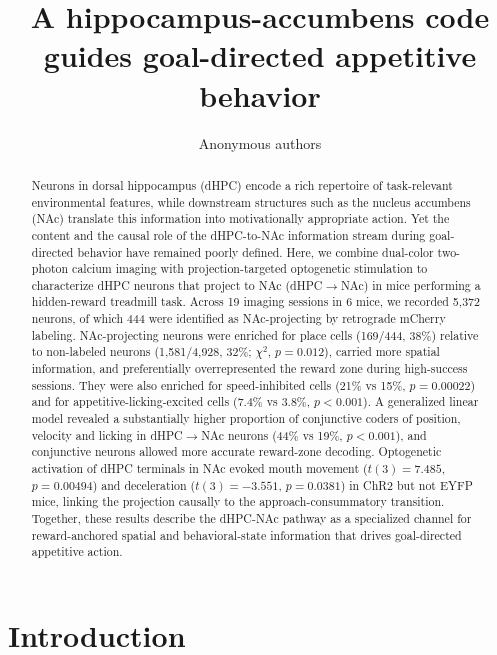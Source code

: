 \documentclass[11pt]{article}
\title{A hippocampus-accumbens code guides goal-directed appetitive behavior}
\author{Anonymous authors}
\affil{Target venue: Nature Neuroscience}
\date{}
\begin{document}
\maketitle

\begin{abstract}
Neurons in dorsal hippocampus (dHPC) encode a rich repertoire of task-relevant environmental features, while downstream structures such as the nucleus accumbens (NAc) translate this information into motivationally appropriate action. Yet the content and the causal role of the dHPC-to-NAc information stream during goal-directed behavior have remained poorly defined. Here, we combine dual-color two-photon calcium imaging with projection-targeted optogenetic stimulation to characterize dHPC neurons that project to NAc (dHPC$\rightarrow$NAc) in mice performing a hidden-reward treadmill task. Across 19 imaging sessions in 6 mice, we recorded 5{,}372 neurons, of which 444 were identified as NAc-projecting by retrograde mCherry labeling. NAc-projecting neurons were enriched for place cells (169/444, 38\%) relative to non-labeled neurons (1{,}581/4{,}928, 32\%; $\chi^2$, $p=0.012$), carried more spatial information, and preferentially overrepresented the reward zone during high-success sessions. They were also enriched for speed-inhibited cells (21\% vs 15\%, $p=0.00022$) and for appetitive-licking-excited cells (7.4\% vs 3.8\%, $p<0.001$). A generalized linear model revealed a substantially higher proportion of conjunctive coders of position, velocity and licking in dHPC$\rightarrow$NAc neurons (44\% vs 19\%, $p<0.001$), and conjunctive neurons allowed more accurate reward-zone decoding. Optogenetic activation of dHPC terminals in NAc evoked mouth movement ($t(3)=7.485$, $p=0.00494$) and deceleration ($t(3)=-3.551$, $p=0.0381$) in ChR2 but not EYFP mice, linking the projection causally to the approach-consummatory transition. Together, these results describe the dHPC-NAc pathway as a specialized channel for reward-anchored spatial and behavioral-state information that drives goal-directed appetitive action.
\end{abstract}

\section{Introduction}
\end{document}
